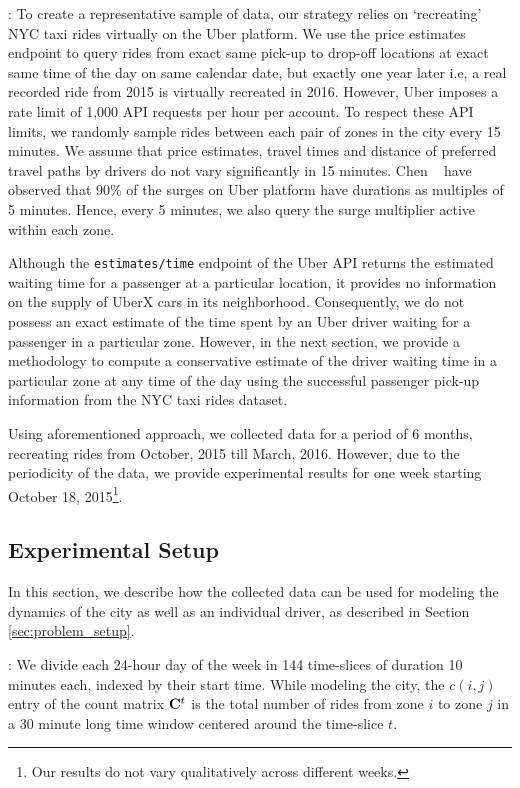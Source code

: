 :
To create a representative sample of data, our strategy relies on `recreating' NYC taxi rides virtually on the Uber platform. We use the price estimates endpoint to query rides from exact same pick-up to drop-off locations at exact same time of the day on same calendar date, but exactly one year later i.e, a real recorded ride from 2015 is virtually recreated in 2016. However, Uber imposes a rate limit of 1,000 API requests per hour per account. To respect these API limits, we randomly sample rides between each pair of zones in the city every 15 minutes. We assume that price estimates, travel times and distance of preferred travel paths by drivers do not vary significantly in 15 minutes. Chen {\etal}~\cite{chen2015peeking} have observed that 90\% of the surges on Uber platform have durations as multiples of 5 minutes. Hence, every 5 minutes, we also query the surge multiplier active within each zone.

Although the \texttt{estimates/time} endpoint of the Uber API returns the estimated waiting time for a passenger at a particular location, it provides no information on the supply of UberX cars in its neighborhood. Consequently, we do not possess an exact estimate of the time spent by an Uber driver waiting for a passenger in a particular zone. However, in the next section, we provide a methodology to compute a conservative estimate of the driver waiting time in a particular zone at any time of the day using the successful passenger pick-up information from the NYC taxi rides dataset.

Using aforementioned approach, we collected data for a period of 6 months, recreating rides from October, 2015 till March, 2016. However, due to the periodicity of the data, we provide experimental results for one week starting October 18, 2015\footnote{Our results do not vary qualitatively across different weeks.}.

\subsection{Experimental Setup}
In this section, we describe how the collected data can be used for modeling the dynamics of the city as well as an individual driver, as described in Section \ref{sec:problem_setup}.


:
We divide each 24-hour day of the week in 144 time-slices of duration 10 minutes each, indexed by their start time. While modeling the city, the $c(i,j)$ entry of the count matrix ${\mathbf{C}}^t$ is the total number of rides from zone $i$ to zone $j$ in a 30 minute long time window centered around the time-slice $t$. 

